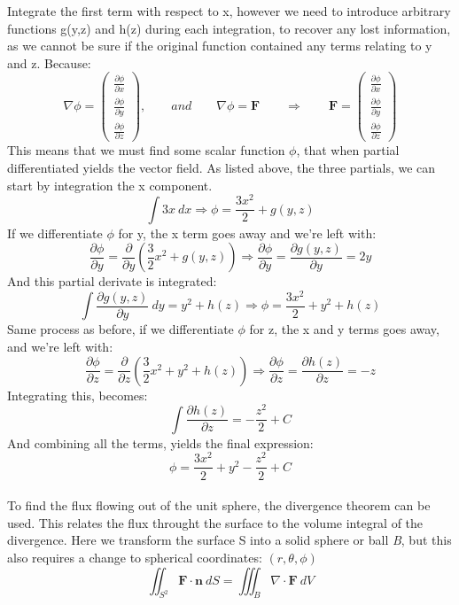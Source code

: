 Integrate the first term with respect to x, however we need to introduce arbitrary functions g(y,z) and h(z) during each integration, to recover any
lost information, as we cannot be sure if the original function contained any terms relating to y and z.
Because:
\[\nabla\phi = 
\begin{pmatrix}
\frac{\partial \phi}{\partial x}\\    
\frac{\partial \phi}{\partial y}\\
\frac{\partial \phi}{\partial z}    
\end{pmatrix},
\qquad
\textit{and}
\qquad
\nabla\phi = \mathbf{F}
\qquad
\Rightarrow
\qquad
\mathbf{F} =
\begin{pmatrix}
\frac{\partial \phi}{\partial x}\\    
\frac{\partial \phi}{\partial y}\\
\frac{\partial \phi}{\partial z}    
\end{pmatrix}
\]
This means that we must find some scalar function $\phi$, that when partial differentiated yields the vector field.
As listed above, the three partials, we can start by integration the x component. 
\[\int 3x \ dx \Rightarrow \phi = \frac{3x^2}{2} + g(y,z)\]
If we differentiate $\phi$ for y, the x term goes away and we're left with:
\[\frac{\partial \phi}{\partial y} = \frac{\partial}{\partial y} \left(\frac{3}{2}x^2 +g(y,z)\right) \Rightarrow \frac{\partial \phi}{\partial y} = \frac{\partial g(y,z)}{\partial y} = 2y \]
And this partial derivate is integrated: 
\[\int \frac{\partial g(y,z)}{\partial y} \ dy = y^2 + h(z) \Rightarrow \phi = \frac{3x^2}{2} + y^2 + h(z)\]
Same process as before, if we differentiate $\phi$ for z, the x and y terms goes away, and we're left with:
\[\frac{\partial \phi}{\partial z} = \frac{\partial}{\partial z} \left(\frac{3}{2}x^2 + y^2 + h(z)\right) \Rightarrow \frac{\partial \phi}{\partial z} = \frac{\partial h(z)}{\partial z} = -z\]
Integrating this, becomes:
\[\int \frac{\partial h(z)}{\partial z} = -\frac{z^2}{2} + C\]
And combining all the terms, yields the final expression:
\[\phi = \frac{3x^2}{2}  + y^2 -\frac{z^2}{2} + C \]
\\
To find the flux flowing out of the unit sphere, the divergence theorem can be used. This relates the flux throught the surface
to the volume integral of the divergence. Here we transform the surface S into a solid sphere or ball \textit{B}, but this also requires a change to spherical coordinates:
$(r, \theta, \phi)$
\[\iint_{S^2} \mathbf{F} \cdot \mathbf{n} \ dS = \iiint_B \nabla \cdot \mathbf{F} \ dV\]
